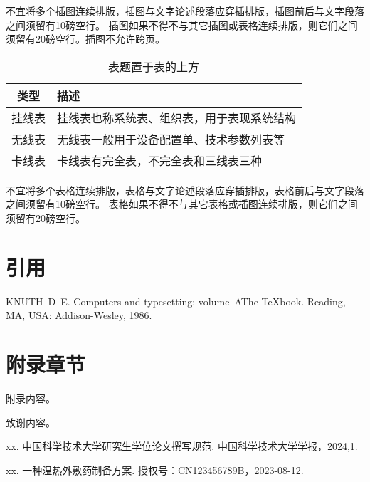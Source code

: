 不宜将多个插图连续排版，插图与文字论述段落应穿插排版，插图前后与文字段落之间须留有10磅空行。
插图如果不得不与其它插图或表格连续排版，则它们之间须留有20磅空行。插图不允许跨页。

\begin{table}[h]
  \centering
  \caption{表题置于表的上方}
  \label{tab:exampletable}
  \begin{tabular}{cl}
    \toprule
    类型   & 描述                                       \\
    \midrule
    挂线表 & 挂线表也称系统表、组织表，用于表现系统结构 \\
    无线表 & 无线表一般用于设备配置单、技术参数列表等   \\
    卡线表 & 卡线表有完全表，不完全表和三线表三种       \\
    \bottomrule
  \end{tabular}
\end{table}

不宜将多个表格连续排版，表格与文字论述段落应穿插排版，表格前后与文字段落之间须留有10磅空行。
表格如果不得不与其它表格或插图连续排版，则它们之间须留有20磅空行。

\chapter{引用}
\cite{knuth86a}

\backmatter
\begin{thebibliography}{1}
KNUTH~D~E.
\newblock Computers and typesetting: volume~A\quad The
  {\TeX}book\allowbreak[M].
\newblock Reading, MA, USA: Addison-Wesley, 1986.
\end{thebibliography}

\appendix
\chapter{附录章节}
附录内容。

\begin{acknowledgements}
  致谢内容。
\end{acknowledgements}

\begin{achievements}

\begin{theachievements}[已发表论文]
  \item xx. 中国科学技术大学研究生学位论文撰写规范. 中国科学技术大学学报，2024,1.
\end{theachievements}

\begin{theachievements}[发明专利]
  \item xx. 一种温热外敷药制备方案. 授权号：CN123456789B，2023-08-12.
\end{theachievements}

\end{achievements}
